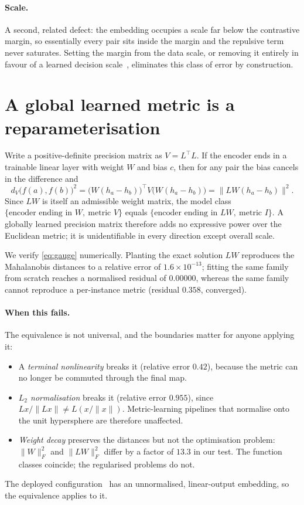 \documentclass[11pt]{article}
\begin{document}
\paragraph{Scale.} A second, related defect: the embedding occupies a scale far
below the contrastive margin, so essentially every pair sits inside the margin
and the repulsive term never saturates. Setting the margin from the data scale,
or removing it entirely in favour of a learned decision scale~\cite{hib},
eliminates this class of error by construction.

\section{A global learned metric is a reparameterisation}
\label{sec:gauge}

Write a positive-definite precision matrix as $V = L^\top L$. If the encoder ends
in a trainable linear layer with weight $W$ and bias $c$, then for any pair the
bias cancels in the difference and
\begin{equation}
d_V\big(f(a), f(b)\big)^2
 = \big(W(h_a - h_b)\big)^\top V \big(W(h_a-h_b)\big)
 = \big\lVert LW (h_a - h_b) \big\rVert^2 .
\label{eq:gauge}
\end{equation}
Since $LW$ is itself an admissible weight matrix, the model class
$\{\text{encoder ending in } W,\ \text{metric } V\}$ equals
$\{\text{encoder ending in } LW,\ \text{metric } I\}$. A globally learned
precision matrix therefore adds no expressive power over the Euclidean metric; it
is unidentifiable in every direction except overall scale.

We verify \cref{eq:gauge} numerically. Planting the exact solution $LW$ reproduces
the Mahalanobis distances to a relative error of $1.6\times10^{-13}$; fitting the
same family from scratch reaches a normalised residual of $0.00000$, whereas the
same family cannot reproduce a per-instance metric (residual $0.358$, converged).

\paragraph{When this fails.} The equivalence is not universal, and the boundaries
matter for anyone applying it:
\begin{itemize}
\item A \emph{terminal nonlinearity} breaks it (relative error $0.42$), because
  the metric can no longer be commuted through the final map.
\item \emph{$L_2$ normalisation} breaks it (relative error $0.955$), since
  $Lx/\lVert Lx\rVert \neq L(x/\lVert x\rVert)$. Metric-learning pipelines that
  normalise onto the unit hypersphere are therefore unaffected.
\item \emph{Weight decay} preserves the distances but not the optimisation
  problem: $\lVert W\rVert_F^2$ and $\lVert LW\rVert_F^2$ differ by a factor of
  $13.3$ in our test. The function classes coincide; the regularised problems do
  not.
\end{itemize}
The deployed configuration~\cite{dp2025048} has an unnormalised, linear-output
embedding, so the equivalence applies to it.
\end{document}
